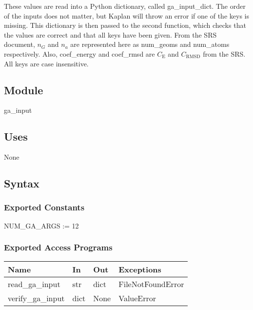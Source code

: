 \documentclass[12pt, titlepage]{article}
\newcommand{\progname}{Kaplan}
\begin{document}
These values are read into a Python dictionary, called ga\_input\_dict. The 
order of the inputs does not matter, but \progname{} will throw an error if one 
of the keys is missing. This dictionary is then passed to the second function, 
which checks that the values are correct and that all keys have been given. 
From the SRS document, $n_G$ and $n_a$ are represented here as num\_geoms and 
num\_atoms respectively. Also, coef\_energy and coef\_rmsd are $C_\text{E}$ and 
$C_\text{RMSD}$ from the SRS. All keys are case insensitive.


\subsection{Module}

ga\_input

\subsection{Uses}

None

\subsection{Syntax}

\subsubsection{Exported Constants}

NUM\_GA\_ARGS := 12

\subsubsection{Exported Access Programs}

\begin{table}[H]
	\begin{tabular}{p{4cm} p{2cm} p{2cm} p{5cm}}
		\toprule
		\textbf{Name} & \textbf{In} & \textbf{Out} & \textbf{Exceptions} \\
		\hline
		read\_ga\_input   & str  & dict & FileNotFoundError \\
		verify\_ga\_input & dict & None    & ValueError \\
		\bottomrule
	\end{tabular}
\end{table}
\end{document}

